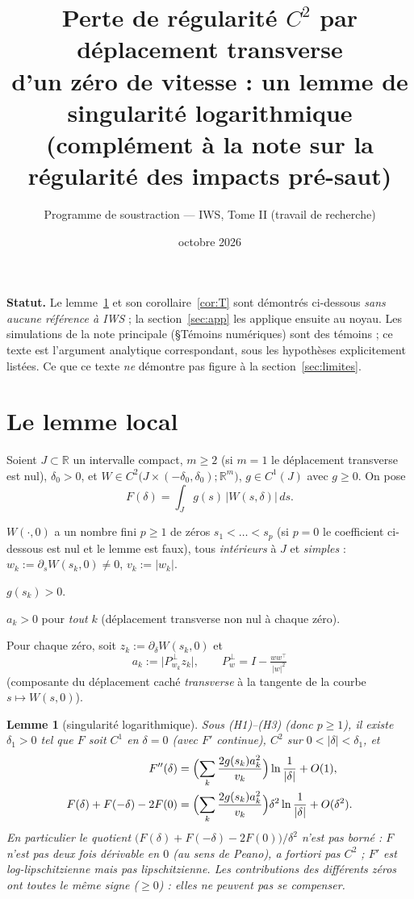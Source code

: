 \documentclass[11pt,a4paper]{article}
\title{Perte de régularité $C^2$ par déplacement transverse\\ d'un zéro de vitesse : un lemme de singularité logarithmique\\[2pt]
\large (complément à la note sur la régularité des impacts pré-saut)}
\author{Programme de soustraction --- IWS, Tome II (travail de recherche)}
\date{octobre 2026}
\newtheorem{lemme}[theoreme]{Lemme}
\theoremstyle{remark}
\newcommand{\R}{\mathbb R}
\newcommand{\dl}{\delta}
\begin{document}
\maketitle

\noindent\textbf{Statut.} Le lemme~\ref{lem:log} et son corollaire~\ref{cor:T} sont démontrés ci-dessous \emph{sans aucune référence à IWS} ; la section~\ref{sec:app} les applique ensuite au noyau. Les simulations de la note principale (§Témoins numériques) sont des témoins ; ce texte est l'argument analytique correspondant, sous les hypothèses explicitement listées. Ce que ce texte \emph{ne} démontre pas figure à la section~\ref{sec:limites}.

\section{Le lemme local}

Soient $J\subset\R$ un intervalle compact, $m\ge2$ (si $m=1$ le déplacement transverse est nul), $\dl_0>0$, et
$W\in C^2\bigl(J\times(-\dl_0,\dl_0);\R^m\bigr)$, $g\in C^1(J)$ avec $g\ge0$. On pose
\[
F(\dl)=\int_J g(s)\,\lvert W(s,\dl)\rvert\,ds .
\]
\begin{description}[nosep]
\item[(H1)] $W(\cdot,0)$ a un nombre fini $p\ge1$ de zéros $s_1<\dots<s_p$ (si $p=0$ le coefficient ci-dessous est nul et le lemme est faux), tous \emph{intérieurs} à $J$ et \emph{simples} : $w_k:=\partial_sW(s_k,0)\neq0$, $v_k:=\lvert w_k\rvert$.
\item[(H2)] $g(s_k)>0$.
\item[(H3)] $a_k>0$ pour \emph{tout} $k$ (déplacement transverse non nul à chaque zéro).
\end{description}
Pour chaque zéro, soit $z_k:=\partial_\dl W(s_k,0)$ et
\[
a_k:=\bigl\lvert P^\perp_{w_k}z_k\bigr\rvert,\qquad P^\perp_{w}=I-\tfrac{ww^\top}{\lvert w\rvert^2}
\]
(composante du déplacement caché \emph{transverse} à la tangente de la courbe $s\mapsto W(s,0)$).

\begin{lemme}[singularité logarithmique]\label{lem:log}
Sous (H1)--(H3) (donc $p\ge1$), il existe $\dl_1>0$ tel que $F$ soit $C^1$ en $\dl=0$ (avec $F'$ continue), $C^2$ sur $0<\lvert\dl\rvert<\dl_1$, et
\begin{align}
F''(\dl)&=\Bigl(\sum_k\frac{2g(s_k)a_k^2}{v_k}\Bigr)\ln\frac1{\lvert\dl\rvert}+O(1),\label{eq:Fpp}\\
F(\dl)+F(-\dl)-2F(0)&=\Bigl(\sum_k\frac{2g(s_k)a_k^2}{v_k}\Bigr)\dl^2\ln\frac1{\lvert\dl\rvert}+O(\dl^2).\label{eq:Fdiff}
\end{align}
En particulier le quotient $\bigl(F(\dl)+F(-\dl)-2F(0)\bigr)/\dl^2$ n'est pas borné : $F$ n'est pas deux fois dérivable en $0$ (au sens de Peano), a fortiori pas $C^2$ ; $F'$ est log-lipschitzienne mais pas lipschitzienne. Les contributions des différents zéros ont toutes le \emph{même signe} ($\ge0$) : elles ne peuvent pas se compenser.
\end{lemme}
\end{document}
